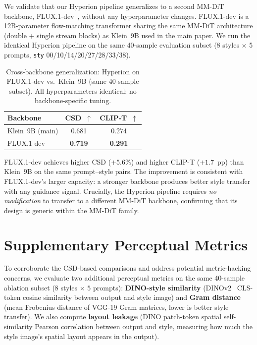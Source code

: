 We validate that our Hyperion pipeline generalizes to a second MM-DiT backbone, FLUX.1-dev~\cite{flux2024}, without any hyperparameter changes.
FLUX.1-dev is a 12B-parameter flow-matching transformer sharing the same MM-DiT architecture (double + single stream blocks) as Klein~9B used in the main paper.
We run the identical Hyperion pipeline on the same 40-sample evaluation subset (8 styles $\times$ 5 prompts, \texttt{sty} 00/10/14/20/27/28/33/38).

\begin{table}[h]
  \centering
  \caption{%
    Cross-backbone generalization: Hyperion on FLUX.1-dev vs.\ Klein~9B (same 40-sample subset).
    All hyperparameters identical; no backbone-specific tuning.%
  }
  \label{tab:flux1dev}
  \footnotesize
  \begin{tabular}{lcc}
    \toprule
    Backbone & CSD~$\uparrow$ & CLIP-T~$\uparrow$ \\
    \midrule
    Klein~9B (main)    & 0.681 & 0.274 \\
    FLUX.1-dev         & \textbf{0.719} & \textbf{0.291} \\
    \bottomrule
  \end{tabular}
\end{table}

FLUX.1-dev achieves higher CSD ($+5.6\%$) and higher CLIP-T ($+1.7$~pp) than Klein~9B on the same prompt--style pairs.
The improvement is consistent with FLUX.1-dev's larger capacity: a stronger backbone produces better style transfer with any guidance signal.
Crucially, the Hyperion pipeline requires \emph{no modification} to transfer to a different MM-DiT backbone, confirming that its design is generic within the MM-DiT family.

\section{Supplementary Perceptual Metrics}
\label{app:supp_metrics}

To corroborate the CSD-based comparisons and address potential metric-hacking concerns, we evaluate two additional perceptual metrics on the same 40-sample ablation subset ($8$ styles $\times$ $5$ prompts): \textbf{DINO-style similarity} (DINOv2~\cite{oquab2024dinov2} CLS-token cosine similarity between output and style image) and \textbf{Gram distance} (mean Frobenius distance of VGG-19 Gram matrices, lower is better style transfer).
We also compute \textbf{layout leakage} (DINO patch-token spatial self-similarity Pearson correlation between output and style, measuring how much the style image's spatial layout appears in the output).

